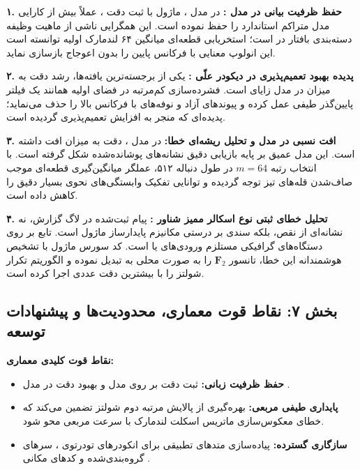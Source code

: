 \textbf{۱. حفظ ظرفیت بیانی در مدل :}
در مدل ، ماژول  با ثبت دقت ، عملاً بیش از  کارایی مدل متراکم استاندارد  را حفظ نموده است. این همگرایی ناشی از ماهیت وظیفه دسته‌بندی بافتار در  است؛ استخریابی قطعه‌ای میانگین ۶۴ لندمارک اولیه توانسته است این انولوپ معنایی با فرکانس پایین را بدون اعوجاج بازسازی نماید.

\textbf{۲. پدیده بهبود تعمیم‌پذیری در دیکودر علّی :}
یکی از برجسته‌ترین یافته‌ها، رشد دقت به میزان \textbf{} در مدل زایای  است. فشرده‌سازی کم‌مرتبه در فضای اولیه همانند یک فیلتر پایین‌گذر طیفی  عمل کرده و پیوندهای آزاد و نوفه‌های با فرکانس بالا را حذف می‌نماید؛ پدیده‌ای که منجر به افزایش تعمیم‌پذیری گردیده است.

\textbf{۳. افت نسبی در مدل  و تحلیل ریشه‌ای خطا:}
در مدل ، دقت به میزان  افت داشته است. این مدل عمیق بر پایه بازیابی دقیق نشانه‌های پوشانده‌شده شکل گرفته است. با انتخاب رتبه $m=64$ در طول دنباله ۵۱۲، عملگر میانگین‌گیری قطعه‌ای موجب صاف‌شدن قله‌های تیز توجه  گردیده و توانایی تفکیک وابستگی‌های نحوی بسیار دقیق را کاهش داده است.

\textbf{۴. تحلیل خطای ثبتی نوع اسکالر ممیز شناور :}
پیام ثبت‌شده  در لاگ گزارش، نه نشانه‌ای از نقص، بلکه سندی بر درستی مکانیزم پایدارساز ماژول است. تابع  بر روی دستگاه‌های گرافیکی مستلزم ورودی‌های  یا  است. کد سورس ماژول با تشخیص هوشمندانه این خطا، تانسور $\mathbf{F}_2$ را به صورت محلی به  تبدیل نموده و الگوریتم تکرار شولتز را با بیشترین دقت عددی اجرا کرده است.

\subsection*{بخش ۷: نقاط قوت معماری، محدودیت‌ها و پیشنهادات توسعه }

\textbf{نقاط قوت کلیدی معماری:}
\begin{itemize}
    \item \textbf{حفظ ظرفیت زبانی:} ثبت دقت  بر روی مدل  و بهبود  دقت در مدل .
    \item \textbf{پایداری طیفی مربعی:} بهره‌گیری از پالایش مرتبه دوم شولتز تضمین می‌کند که خطای معکوس‌سازی ماتریس اسکلت لندمارک با سرعت مربعی محو شود.
    \item \textbf{سازگاری گسترده:} پیاده‌سازی متدهای تطبیقی برای انکودرهای تودرتوی ، سرهای گروه‌بندی‌شده  و کدهای مکانی .
\end{itemize}

